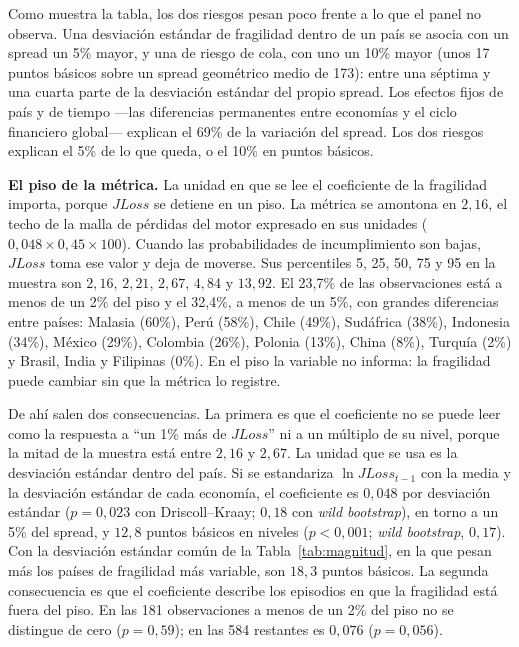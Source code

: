 Como muestra la tabla, los dos riesgos pesan poco frente a lo que el panel no observa. Una desviación estándar de fragilidad dentro de un país se asocia con un spread un 5\% mayor, y una de riesgo de cola, con uno un 10\% mayor (unos 17 puntos básicos sobre un spread geométrico medio de 173): entre una séptima y una cuarta parte de la desviación estándar del propio spread. Los efectos fijos de país y de tiempo ---las diferencias permanentes entre economías y el ciclo financiero global--- explican el 69\% de la variación del spread. Los dos riesgos explican el 5\% de lo que queda, o el 10\% en puntos básicos.

\textbf{El piso de la métrica.} La unidad en que se lee el coeficiente de la fragilidad importa, porque $JLoss$ se detiene en un piso. La métrica se amontona en $2{,}16$, el techo de la malla de pérdidas del motor expresado en sus unidades ($0{,}048\times0{,}45\times100$). Cuando las probabilidades de incumplimiento son bajas, $JLoss$ toma ese valor y deja de moverse. Sus percentiles 5, 25, 50, 75 y 95 en la muestra son $2{,}16$, $2{,}21$, $2{,}67$, $4{,}84$ y $13{,}92$. El 23,7\% de las observaciones está a menos de un 2\% del piso y el 32,4\%, a menos de un 5\%, con grandes diferencias entre países: Malasia (60\%), Perú (58\%), Chile (49\%), Sudáfrica (38\%), Indonesia (34\%), México (29\%), Colombia (26\%), Polonia (13\%), China (8\%), Turquía (2\%) y Brasil, India y Filipinas (0\%). En el piso la variable no informa: la fragilidad puede cambiar sin que la métrica lo registre.

De ahí salen dos consecuencias. La primera es que el coeficiente no se puede leer como la respuesta a ``un 1\% más de $JLoss$'' ni a un múltiplo de su nivel, porque la mitad de la muestra está entre $2{,}16$ y $2{,}67$. La unidad que se usa es la desviación estándar dentro del país. Si se estandariza $\ln JLoss_{t-1}$ con la media y la desviación estándar de cada economía, el coeficiente es $0{,}048$ por desviación estándar ($p=0{,}023$ con Driscoll--Kraay; $0{,}18$ con \textit{wild bootstrap}), en torno a un 5\% del spread, y $12{,}8$ puntos básicos en niveles ($p<0{,}001$; \textit{wild bootstrap}, $0{,}17$). Con la desviación estándar común de la Tabla~\ref{tab:magnitud}, en la que pesan más los países de fragilidad más variable, son $18{,}3$ puntos básicos. La segunda consecuencia es que el coeficiente describe los episodios en que la fragilidad está fuera del piso. En las 181 observaciones a menos de un 2\% del piso no se distingue de cero ($p=0{,}59$); en las 584 restantes es $0{,}076$ ($p=0{,}056$).

